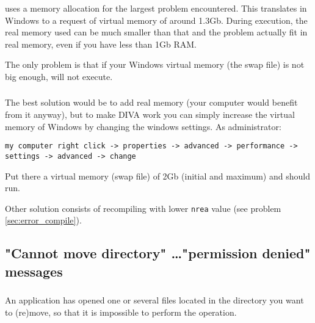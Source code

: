 \diva uses a memory allocation for the largest problem encountered. This 
translates in Windows to a request of virtual memory of around 1.3Gb.
During execution, the real memory used can be much smaller than that and 
the problem actually fit in real memory, even if you have less than 1Gb RAM.

The only problem is that if your Windows virtual memory (the swap file) 
is not big enough, \diva will not execute.


\subsubsection{\answer}

The best solution would be to 
add real memory (your computer would benefit from it anyway), but to 
make DIVA work you can simply increase the virtual memory of Windows by 
changing the windows settings. As administrator:\\

\begin{verbatim}
my computer right click -> properties -> advanced -> performance -> 
settings -> advanced -> change
\end{verbatim}

Put there a virtual memory (swap file) of 2Gb (initial and maximum) and 
\diva should run. 


Other solution consists of recompiling with lower \texttt{nrea} value (see problem \ref{sec:error_compile}).



\subsection{"Cannot move directory" \ldots "permission denied" messages}



\subsubsection{\question}

An application has opened one or several files located in the directory you want to (re)move, so that it is impossible to perform the operation.


